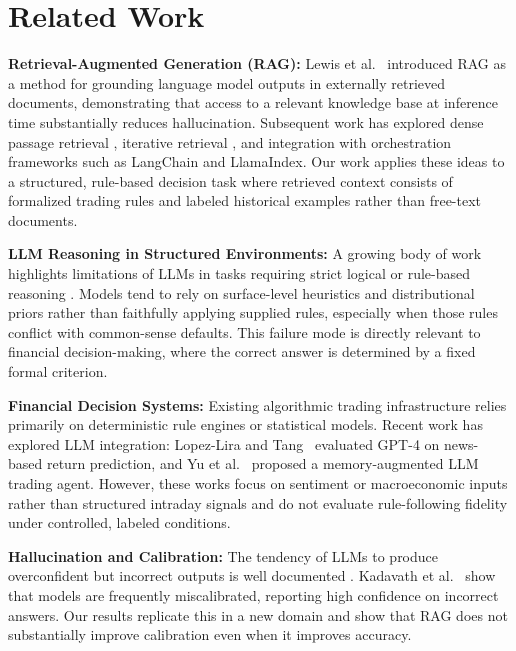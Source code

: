 \documentclass{article}
\begin{document}
\section{Related Work}

\textbf{Retrieval-Augmented Generation (RAG):} Lewis et al.~\cite{lewis2020retrieval} introduced RAG as a method for grounding language model outputs in externally retrieved documents, demonstrating that access to a relevant knowledge base at inference time substantially reduces hallucination. Subsequent work has explored dense passage retrieval \cite{karpukhin2020dense}, iterative retrieval \cite{shi2023replug}, and integration with orchestration frameworks such as LangChain and LlamaIndex. Our work applies these ideas to a structured, rule-based decision task where retrieved context consists of formalized trading rules and labeled historical examples rather than free-text documents.

\textbf{LLM Reasoning in Structured Environments:} A growing body of work highlights limitations of LLMs in tasks requiring strict logical or rule-based reasoning \cite{zhao2023survey}. Models tend to rely on surface-level heuristics and distributional priors rather than faithfully applying supplied rules, especially when those rules conflict with common-sense defaults. This failure mode is directly relevant to financial decision-making, where the correct answer is determined by a fixed formal criterion.

\textbf{Financial Decision Systems:} Existing algorithmic trading infrastructure relies primarily on deterministic rule engines or statistical models. Recent work has explored LLM integration: Lopez-Lira and Tang~\cite{lopez2023can} evaluated GPT-4 on news-based return prediction, and Yu et al.~\cite{yu2023finmem} proposed a memory-augmented LLM trading agent. However, these works focus on sentiment or macroeconomic inputs rather than structured intraday signals and do not evaluate rule-following fidelity under controlled, labeled conditions.

\textbf{Hallucination and Calibration:} The tendency of LLMs to produce overconfident but incorrect outputs is well documented \cite{rawte2023survey, ji2023survey, kadavath2022language}. Kadavath et al.~\cite{kadavath2022language} show that models are frequently miscalibrated, reporting high confidence on incorrect answers. Our results replicate this in a new domain and show that RAG does not substantially improve calibration even when it improves accuracy.
\end{document}
